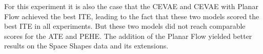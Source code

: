 \documentclass{report}
\begin{document}
For this experiment it is also the case that the CEVAE and CEVAE with Planar Flow achieved the best ITE, leading to the fact that these two models scored the best ITE in all experiments. But these two models did not reach comparable scores for the ATE and PEHE. The addition of the Planar Flow yielded better results on the Space Shapes data and its extensions.

\setlength{\belowcaptionskip}{0pt}
\end{document}
